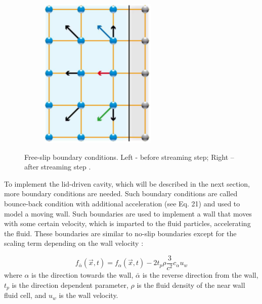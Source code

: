 \begin{figure}[H]
\begin{subfigure}[h]{0.3\textwidth}
    \includegraphics[width=\textwidth]{img/fig9-2.png}
  \end{subfigure}
  \caption{Free-slip boundary conditions. Left - before streaming step; Right – after streaming step \cite{pflaum}.}\label{fig:free-slip-BC}
\end{figure}

To implement the lid-driven cavity, which will be described in the next section, more boundary conditions are needed. Such boundary conditions are called bounce-back condition with additional acceleration (see Eq. 21) and used to model a moving wall. Such boundaries are used to implement a wall that moves with some certain velocity, which is imparted to the fluid particles, accelerating the fluid. These boundaries are similar to no-slip boundaries except for the scaling term depending on the wall velocity \cite{pflaum}:

\begin{equation}
f_{\bar{\alpha}}(\vec{x},t) = f_{\alpha}(\vec{x},t) - 2 t_p \rho \frac{3}{c^2} c_{\alpha} u_{w}
\end{equation}
where $\alpha$ is the direction towards the wall, $\bar{\alpha}$ is the reverse direction from the wall, $t_p$ is the direction dependent parameter, $\rho$ is the fluid density of the near wall fluid cell, and $u_w$ is the wall velocity.
